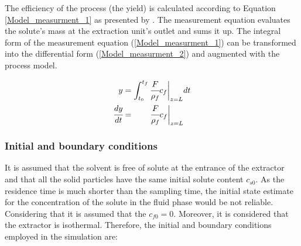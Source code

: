 \documentclass[../Article_Model_Parameters.tex]{subfiles}
\begin{document}
		The efficiency of the process (the yield) is calculated according to Equation \ref{Model_measurment_1} as presented by \citet{Sovova1994a}. The measurement equation evaluates the solute's mass at the extraction unit's outlet and sums it up. The integral form of the measurement equation (\ref{Model_measurment_1}) can be transformed into the differential form (\ref{Model_measurment_2}) and augmented with the process model.
			
		{\footnotesize
			\begin{align} 
				\label{Model_measurment_1}
				y &= \int_{t_0}^{t_f} \cfrac{F}{\rho_f} c_f \biggr\rvert_{z=L} dt \\
				\cfrac{dy}{dt} &= \qquad \cfrac{F}{\rho_f} c_f \biggr\rvert_{z=L} 
                \label{Model_measurment_2}
		\end{align}	}
  
		\subsubsection{Initial and boundary conditions} 
		It is assumed that the solvent is free of solute at the entrance of the extractor and that all the solid particles have the same initial solute content $c_{s0}$. As the residence time is much shorter than the sampling time, the initial state estimate for the concentration of the solute in the fluid phase would be not reliable. Considering that it is assumed that the $c_{f0}=0$. Moreover, it is considered that the extractor is isothermal. %
		Therefore, the initial and boundary conditions employed in the simulation are:
			

			
\end{document}

